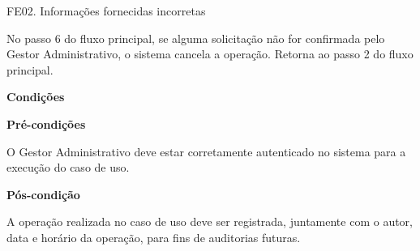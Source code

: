   FE02. Informações fornecidas incorretas
  
   No passo 6 do fluxo principal, se alguma solicitação não for confirmada pelo Gestor Administrativo, o 
 sistema cancela a operação. Retorna ao passo 2 do fluxo principal.



	
   {\raggedright
      \textbf{Condições}
   }
   
    
   \textbf{Pré-condições}
   
   O Gestor Administrativo deve estar corretamente autenticado no sistema para a execução do caso de uso.
   
   \textbf{Pós-condição}
   
   A operação realizada no caso de uso deve ser registrada, juntamente com o autor, data e horário da operação, para fins de auditorias futuras.
  
  \vfill
  \pagebreak


   
 
 
